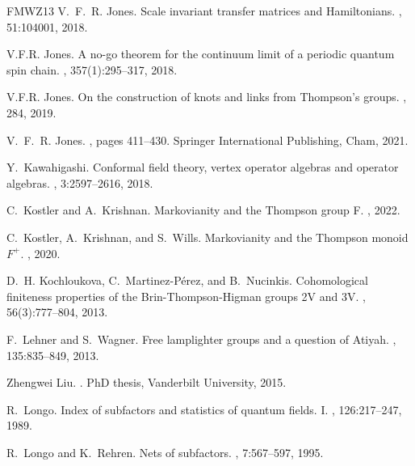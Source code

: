 \documentclass[a4paper, 12pt]{amsart}
\numberwithin{equation}{section}
\theoremstyle{definition}
\begin{document}
\begin{thebibliography}{FMWZ13}
V.~F.~R. Jones.
\newblock Scale invariant transfer matrices and {H}amiltonians.
, 51:104001, 2018.

V.F.R. Jones.
\newblock A no-go theorem for the continuum limit of a periodic quantum spin
  chain.
, 357(1):295--317, 2018.

V.F.R. Jones.
\newblock On the construction of knots and links from {T}hompson's groups.
, 284, 2019.

V.~F.~R. Jones.
, pages 411--430.
\newblock Springer International Publishing, Cham, 2021.

Y.~Kawahigashi.
\newblock Conformal field theory, vertex operator algebras and operator
  algebras.
, 3:2597--2616, 2018.

C.~Kostler and A.~Krishnan.
\newblock Markovianity and the {T}hompson group {F}.
, 2022.

C.~Kostler, A.~Krishnan, and S.~Wills.
\newblock Markovianity and the {T}hompson monoid {$F^+$}.
, 2020.

D.~H. Kochloukova, C.~Martinez-P\'erez, and B.~Nucinkis.
\newblock Cohomological finiteness properties of the {B}rin-{T}hompson-{H}igman
  groups {2V} and {3V}.
, 56(3):777--804, 2013.

F.~Lehner and S.~Wagner.
\newblock Free lamplighter groups and a question of {A}tiyah.
, 135:835--849, 2013.

Zhengwei Liu.
.
\newblock PhD thesis, Vanderbilt University, 2015.

R.~Longo.
\newblock Index of subfactors and statistics of quantum fields. {I}.
, 126:217--247, 1989.

R.~Longo and K.~Rehren.
\newblock Nets of subfactors.
, 7:567--597, 1995.


\end{thebibliography}
\end{document}
